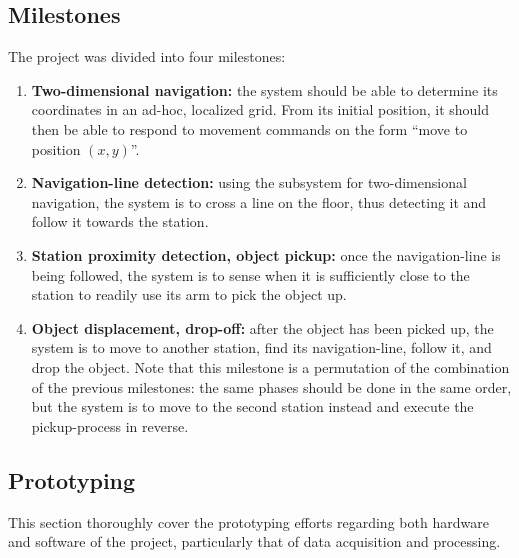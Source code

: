 \subsection{Milestones}
\label{sec:milestones}
The project was divided into four milestones:
\begin{enumerate}
\item \textbf{Two-dimensional navigation:}
  the system should be able to determine its coordinates in an ad-hoc, localized grid.
  From its initial position, it should then be able to respond to movement commands on the form ``move to position $(x, y)$''.

\item \textbf{Navigation-line detection:}
  using the subsystem for two-dimensional navigation, the system is to cross a line on the floor,
  thus detecting it and follow it towards the station.

\item \textbf{Station proximity detection, object pickup:}
  once the navigation-line is being followed, the system is to sense when it is sufficiently close to the station to readily use its arm to pick the object up.

\item \textbf{Object displacement, drop-off:}
  after the object has been picked up, the system is to move to another station, find its navigation-line, follow it, and drop the object.
  Note that this milestone is a permutation of the combination of the previous milestones: the same phases should be done in the same order,
  but the system is to move to the second station instead and execute the pickup-process in reverse.
\end{enumerate}

\subsection{Prototyping}
This section thoroughly cover the prototyping efforts regarding both hardware and software of the project,
particularly that of data acquisition and processing.

